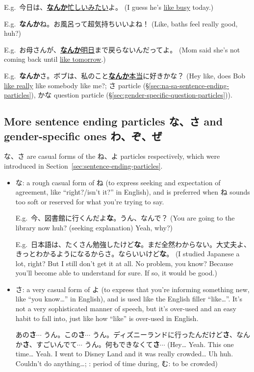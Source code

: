 \documentclass[../nihongo-gakushuu-kyouzai.tex]{subfiles}
\begin{document}
E.g.\ 今日は、\ul{\textbf{なんか}忙しいみたい}よ。 (I guess he's \ul{like busy} today.)

E.g.\ \textbf{なんか}ね。お風呂って超気持ちいいよね！ (Like, baths feel really good, huh?)

E.g.\ お母さんが、\ul{\textbf{なんか}明日}まで戻らないんだってよ。 (Mom said she's not coming back until \ul{like tomorrow}.)

E.g.\ \textbf{なんか}さ。ボブは、私のこと\ul{\textbf{なんか}本当}に好きかな？ (Hey like, does Bob \ul{like really} like somebody like me?; さ particle (\S\ref{sec:na-sa-sentence-ending-particles}), かな question particle (\S\ref{sec:gender-specific-question-particles})).


\subsection{More sentence ending particles な、さ and gender-specific ones わ、ぞ、ぜ} \label{sec:na-sa-wa-zo-ze-sentence-ending-particles}
な、さ are casual forms of the ね、よ particles respectively, which were introduced in Section~\ref{sec:sentence-ending-particles}.

\begin{itemize}
    \item な: a rough casual form of ね (to express seeking and expectation of agreement, like ``right?/isn't it?'' in English), and is preferred when ね sounds too soft or reserved for what you're trying to say.

    E.g.\ 今、図書館に行くんだよ\textbf{な}。うん、なんで？ (You are going to the library now huh? (seeking explanation) Yeah, why?)

    E.g.\ 日本語は、たくさん勉強したけど\textbf{な}。まだ全然わからない。大丈夫よ、きっとわかるようになるからさ。ならいいけど\textbf{な}。 (I studied Japanese a lot, right? But I still don't get it at all. No problem, you know? Because you'll become able to understand for sure. If so, it would be good.)

    \item さ: a very casual form of よ (to express that you're informing something new, like ``you know\dots'' in English), and is used like the English filler ``like\dots''. It's not a very sophisticated manner of speech, but it's over-used and an easy habit to fall into, just like how ``like'' is over-used in English.

    あの\textbf{さ}$\cdots$ うん。この\textbf{さ}$\cdots$ うん。ディズニーランドに行ったんだけど\textbf{さ}、なんか\textbf{さ}、すごいんでて$\cdots$ うん。何もできなくて\textbf{さ}$\cdots$ (Hey\dots{} Yeah. This one time\dots{} Yeah. I went to Disney Land and it was really crowded\dots{} Uh huh. Couldn't do anything\dots{}; : period of time during, む: to be crowded)
\end{itemize}
\end{document}
